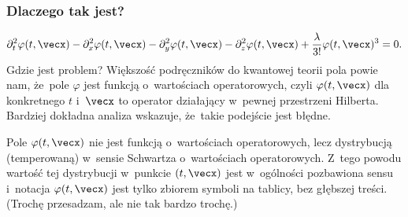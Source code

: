 \documentclass[10pt,t]{beamer}
\begin{document}
\begin{frame}
  \frametitle{Dlaczego tak jest?}

  \vspace{-1.5em}


  \begin{equation}
    \label{eq:Niespodziewane-teoretyczne-01}
    \begin{split}
      \partial_{ t }^{ 2 } \varphi( t, \vecx ) - \partial_{ x }^{ 2 } \varphi( t, \vecx ) -
      \partial_{ y }^{ 2 } \varphi( t, \vecx ) - \partial_{ z }^{ 2 } \varphi( t, \vecx ) +
      \frac{ \lambda }{ 3! } \varphi( t, \vecx )^{ 3 } = 0.
    \end{split}
  \end{equation}
  Gdzie jest problem? Większość podręczników do kwantowej teorii pola
  powie nam, że~pole $\varphi$ jest funkcją o~wartościach operatorowych, czyli
  $\varphi( t, \vecx )$ dla konkretnego $t$ i~$\vecx$ to operator działający
  w~pewnej przestrzeni Hilberta. Bardziej dokładna analiza wskazuje,
  że~takie podejście jest błędne.

  Pole $\varphi( t, \vecx )$ nie jest funkcją o~wartościach operatorowych,
  lecz \alert{dystrybucją (temperowaną) w~sensie Schwartza} o~wartościach
  operatorowych. Z~tego powodu wartość tej dystrybucji w~punkcie
  $( t, \vecx )$ jest w~ogólności pozbawiona sensu i~notacja
  $\varphi( t, \vecx )$ jest tylko zbiorem symboli na tablicy, bez głębszej
  treści. (Trochę przesadzam, ale nie tak bardzo trochę.)

\end{frame}
\end{document}
